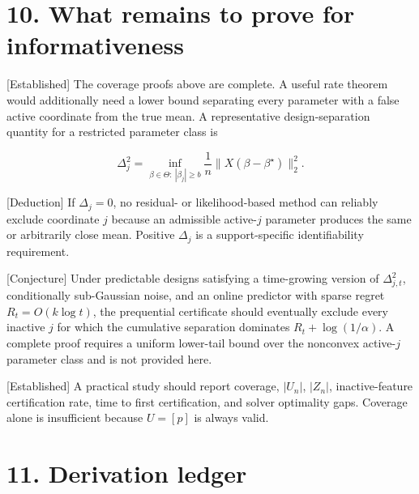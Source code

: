 \documentclass[
  english,
  11pt,
  a4paper,
]{article}
\begin{document}
\section{10. What remains to prove for
informativeness}\label{what-remains-to-prove-for-informativeness}

{[}Established{]} The coverage proofs above are complete. A useful rate
theorem would additionally need a lower bound separating every parameter
with a false active coordinate from the true mean. A representative
design-separation quantity for a restricted parameter class is

$$
\Delta_j^2
=
\inf_{\beta\in\Theta:\ |\beta_j|\ge b}
\frac1n\lVert X(\beta-\beta^\star)\rVert_2^2.
$$

{[}Deduction{]} If $\Delta_j=0$, no residual- or likelihood-based
method can reliably exclude coordinate $j$ because an admissible
active-$j$ parameter produces the same or arbitrarily close mean.
Positive $\Delta_j$ is a support-specific identifiability requirement.

{[}Conjecture{]} Under predictable designs satisfying a time-growing
version of $\Delta_{j,t}^2$, conditionally sub-Gaussian noise, and an
online predictor with sparse regret $R_t=O(k\log t)$, the prequential
certificate should eventually exclude every inactive $j$ for which the
cumulative separation dominates $R_t+\log(1/\alpha)$. A complete proof
requires a uniform lower-tail bound over the nonconvex active-$j$
parameter class and is not provided here.

{[}Established{]} A practical study should report coverage, $|U_n|$,
$|Z_n|$, inactive-feature certification rate, time to first
certification, and solver optimality gaps. Coverage alone is
insufficient because $U=[p]$ is always valid.

\section{11. Derivation ledger}\label{derivation-ledger}
\end{document}
